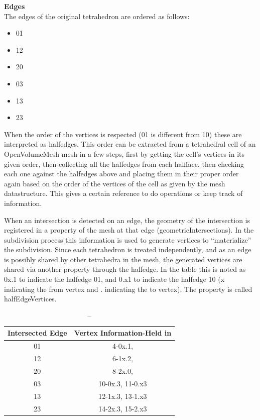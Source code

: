 \textbf{Edges}\\
The edges of the original tetrahedron are ordered as follows:
\begin{itemize}
    \item 01
    \item 12
    \item 20
    \item 03
    \item 13
    \item 23
\end{itemize}

When the order of the vertices is respected (01 is different from 10) these are interpreted as halfedges. This order can be extracted from a tetrahedral cell of an OpenVolumeMesh mesh in a few steps, first by getting the cell's vertices in its given order, then collecting all the halfedges from each halfface, then checking each one against the halfedges above and placing them in their proper order again based on the order of the vertices of the cell as given by the mesh datastructure. This gives a certain reference to do operations or keep track of information.

When an intersection is detected on an edge, the geometry of the intersection is registered in a property of the mesh at that edge (geometricIntersections). In the subdivision process this information is used to generate vertices to \enquote{materialize} the subdivision. Since each tetrahedron is treated independently, and as an edge is possibly shared by other tetrahedra in the mesh, the generated vertices are shared via another property through the halfedge. In the table this is noted as 0x.1 to indicate the halfedge 01, and 0.x1 to indicate the halfedge 10 (x indicating the from vertex and . indicating the to vertex). The property is called halfEdgeVertices.

\begin{table}[]
\begin{tabular}{|c|c|}
\hline
Intersected Edge & Vertex Information-Held in \\ \hline
01               & 4-0x.1,                    \\ \hline
12               & 6-1x.2,                    \\ \hline
20               & 8-2x.0,                    \\ \hline
03               & 10-0x.3, 11-0.x3           \\ \hline
13               & 12-1x.3, 13-1.x3           \\ \hline
23               & 14-2x.3, 15-2.x3           \\ \hline
\end{tabular}
\caption{--}
\end{table}


